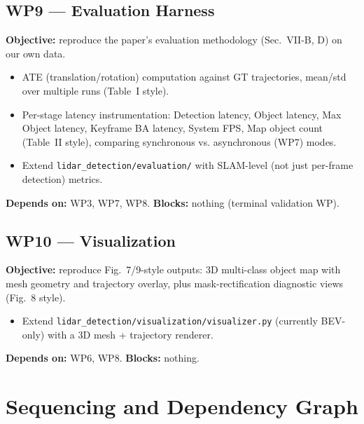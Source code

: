 \documentclass[11pt]{article}
\begin{document}
\subsection*{WP9 --- Evaluation Harness}
\textbf{Objective:} reproduce the paper's evaluation methodology (Sec.~VII-B, D) on our own data.
\begin{itemize}[nosep]
  \item ATE (translation/rotation) computation against GT trajectories, mean/std over multiple runs (Table~I style).
  \item Per-stage latency instrumentation: Detection latency, Object latency, Max Object latency, Keyframe BA latency, System FPS, Map object count (Table~II style), comparing synchronous vs. asynchronous (WP7) modes.
  \item Extend \texttt{lidar\_detection/evaluation/} with SLAM-level (not just per-frame detection) metrics.
\end{itemize}
\textbf{Depends on:} WP3, WP7, WP8. \textbf{Blocks:} nothing (terminal validation WP).

\subsection*{WP10 --- Visualization}
\textbf{Objective:} reproduce Fig.~7/9-style outputs: 3D multi-class object map with mesh geometry and trajectory overlay, plus mask-rectification diagnostic views (Fig.~8 style).
\begin{itemize}[nosep]
  \item Extend \texttt{lidar\_detection/visualization/visualizer.py} (currently BEV-only) with a 3D mesh + trajectory renderer.
\end{itemize}
\textbf{Depends on:} WP6, WP8. \textbf{Blocks:} nothing.

\section{Sequencing and Dependency Graph}
\end{document}
